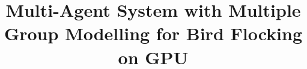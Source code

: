 \documentclass[journal,transmag]{IEEEtran}
\begin{document}
%
\title{Multi-Agent System with Multiple Group Modelling for Bird Flocking
on GPU}




% 		




%







\end{document}
